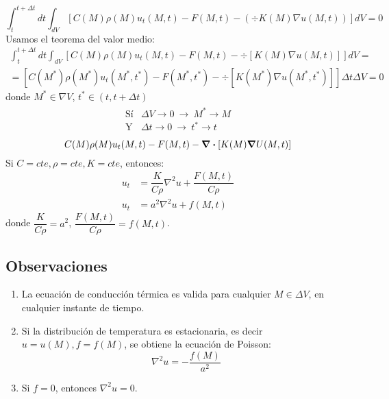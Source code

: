 \documentclass[../main]{subfiles}
\begin{document}
\begin{enumerate}
\begin{align}
    \end{align}
    \begin{equation}
        \int_t^{t+\Delta t} dt \int_{dV} \left[ C(M) \rho(M)u_t(M,t)-F(M,t)-(\div{K(M) \nabla u(M,t)}) \right] dV=0
    \end{equation}
    Usamos el teorema del valor medio:
    \begin{equation}
    \begin{split}
       \int_{t}^{t+\Delta t}dt \int_{dV} \left[ C(M)\rho(M)u_t(M,t)-F(M,t)-\div{[K(M)\nabla u(M,t)]} \right]dV= \\ 
       =\left[ C(M^*)\rho(M^*)u_t(M^*,t^*)-F(M^*,t^*)-\div{[K(M^*)\nabla u(M^*,t^*)]}\right]\Delta t \Delta V=0
    \end{split}
    \end{equation}
    donde $M^* \in \nabla V$, $t^* \in (t,t+\Delta t)$
    \begin{align*}
     \begin{array}{ll}
        \text{Sí} & \Delta V \rightarrow 0 \ \rightarrow \ M^*\rightarrow M \\
        \text{Y} & \Delta t \rightarrow 0 \ \rightarrow \ t^*\rightarrow t
    \end{array}   
    \end{align*}
    \begin{equation}
        C(M)\rho(M)u_t(M,t)-F(M,t)-\div{[K(M)\grad{U(M,t)}]}
    \end{equation}
    Si $C=cte, \rho=cte, K=cte$, entonces:
    \begin{align}
        u_t&=\dfrac{K}{C\rho}\nabla^2 u+\dfrac{F(M,t)}{C\rho} \\
        u_t&=a^2\nabla^2 u+f(M,t)
    \end{align}
    donde $\dfrac{K}{C \rho}=a^2$, $\dfrac{F(M,t)}{C\rho}=f(M,t)$.
    \subsection*{Observaciones}
    \begin{enumerate}
        \item La ecuación de conducción térmica es valida para cualquier $M \in \Delta V$, en cualquier instante de tiempo.
        \item Si la distribución de temperatura es estacionaria, es decir $u=u(M), f=f(M)$, se obtiene la ecuación de Poisson:
        $$
        \nabla^2 u=-\dfrac{f(M)}{a^2}
        $$
        \item Si $f=0$, entonces $\nabla^2 u=0$.
    \end{enumerate}

\end{enumerate}
\end{document}
